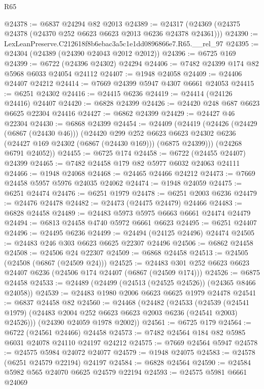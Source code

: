 \begin{lexlean}{R65}
\begin{coremodule}
{@24378 := @6837 @24294 @82 @2013
@24389 := @24317 (@24369 (@24375 @24378 (@24370 @252 @6623 @6623 @2013 @6236 @24378 @24361)))
@24390 := LexLeanPreserve.C212618f8b6ebac3a5c1e1dd0896866e7.R65.__rel_97
@24395 := @24304 (@24389 (@24390 @24043 @2012 @2012))
@24396 := @6725 @169
@24399 := @6722 (@24396 @24302) @24294
@24406 := @7482 @24399 @174 @82 @5968 @6033 @24054 @24112
@24407 := @1948 @24058
@24409 := @24406 @24407 @24212
@24414 := @7669 @24399 @5947 @4307 @6661 @24053
@24415 := @6251 @24302
@24416 := @24415 @6236
@24419 := @24414 (@24126 @24416) @24407
@24420 := @6828 @24399
@24426 := @24420 @248 @687 @6623 @6625 @22304 @24416
@24427 := @6862 @24399
@24429 := @24427 @46 @22304
@24430 := @6868 @24399
@24454 := @24409
    (@24419
      (@24426
        (@24429 (@6867 (@24430 @46)))
        (@24420
          @299
          @252
          @6623
          @6623
          @24302
          @6236
          (@24427 @169 @24302 (@6867 (@24430 @169)))
          (@6875 @24399)))
      (@24268 @6791 @24052))
@24455 := @6725 @174
@24458 := @6722 (@24455 @24407) @24399
@24465 := @7482 @24458 @179 @82 @5977 @6032 @24063 @24111
@24466 := @1948 @24068
@24468 := @24465 @24466 @24212
@24473 := @7669 @24458 @5957 @5976 @24035 @24062
@24474 := @1948 @24059
@24475 := @6251 @24474
@24476 := @6251 @1979
@24478 := @6251 @2003 @6236
@24479 := @24476 @24478
@24482 := @24473 (@24475 @24479) @24466
@24483 := @6828 @24458
@24489 := @24483 @5973 @5975 @6663 @6661 @24474 @24479
@24494 := @6813 @24458 @4740 @5972 @6661 @6623
@24495 := @6251 @24407
@24496 := @24495 @6236
@24499 := @24494 (@24125 @24496) @24474
@24505 := @24483 @246 @303 @6623 @6625 @22307 @24496
@24506 := @6862 @24458
@24508 := @24506 @24 @22307
@24509 := @6868 @24458
@24513 := @24505 (@24508 (@6867 (@24509 @24)))
@24525 := @24483 @301 @252 @6623 @6623 @24407 @6236 (@24506 @174 @24407 (@6867 (@24509 @174)))
@24526 := @6875 @24458
@24533 := @24489 (@24499 (@24513 (@24525 @24526)) (@24365 @8466 @24058))
@24539 := @24483 @1980 @2006 @6623 @6625 @1979 @24478
@24541 := @6837 @24458 @82
@24560 := @24468
    (@24482
      (@24533
        (@24539 (@24541 @1979) (@24483 @2004 @252 @6623 @6623 @2003 @6236 (@24541 @2003) @24526)))
      (@24390 @24059 @1978 @2002))
@24561 := @6725 @179
@24564 := @6722 (@24561 @24466) @24458
@24573 := @7482 @24564 @184 @82 @5985 @6031 @24078 @24110 @24197 @24212
@24575 := @7669 @24564 @5947
@24578 := @24575 @5984 @24072 @24077
@24579 := @1948 @24075
@24583 := @24578 (@6251 @24579 @22194) @24197
@24584 := @6828 @24564
@24590 := @24584 @5982 @565 @24070 @6625 @24579 @22194
@24593 := @24575 @5981 @6661 @24069
}
\end{coremodule}
\end{lexlean}
